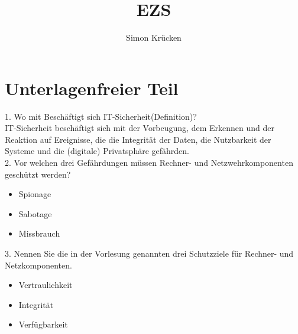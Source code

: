 \documentclass[12pt,a4paper,oneside,ngerman]{article}
\title{EZS}
\author{Simon Krücken}
\begin{document}
    
\begin{titlepage}
\end{titlepage}
\tableofcontents
\pagebreak

\section{Unterlagenfreier Teil}

1. Wo mit Beschäftigt sich IT-Sicherheit(Definition)?\\
IT-Sicherheit beschäftigt sich mit der Vorbeugung, dem Erkennen und der Reaktion auf Ereignisse, die die Integrität der Daten, die Nutzbarkeit der Systeme und die (digitale) Privatsphäre gefährden.\\

2. Vor welchen drei Gefährdungen müssen Rechner- und Netzwehrkomponenten geschützt werden?\\
\begin{itemize}
	\item Spionage
	\item Sabotage
	\item Missbrauch
\end{itemize}

3. Nennen Sie die in der Vorlesung genannten drei Schutzziele für Rechner- und Netzkomponenten.\\
\begin{itemize}
	\item Vertraulichkeit
	\item Integrität
	\item Verfügbarkeit
\end{itemize}
\end{document}
